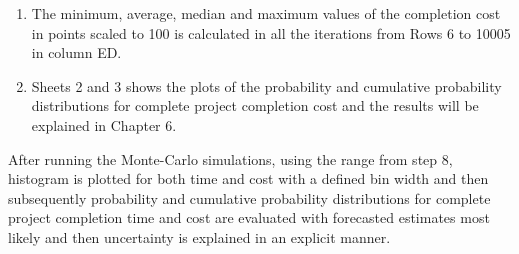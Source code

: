 \begin{enumerate}
	\item The minimum, average, median and maximum values of the completion cost in points scaled to 100 is calculated in all the iterations from Rows 6 to 10005 in column ED.
	
	\item Sheets 2 and 3 shows the plots of the probability and cumulative probability distributions for complete project completion cost and the results will be explained in Chapter 6.
	
	
\end{enumerate}

After running the Monte-Carlo simulations, using the range from step 8, histogram is plotted for both time and cost with a defined bin width and then subsequently probability and cumulative probability distributions for complete project completion time and cost are evaluated with forecasted estimates most likely and then uncertainty is explained in an explicit manner.
